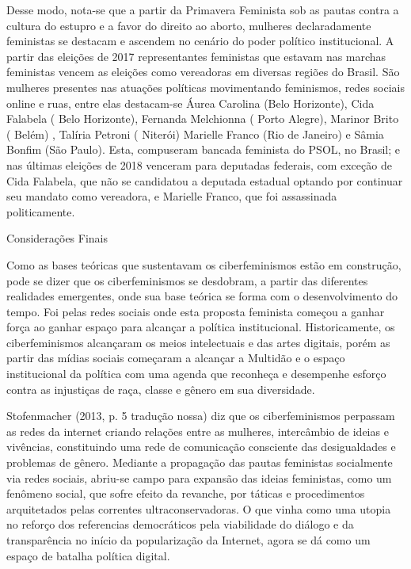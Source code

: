Desse modo, nota-se que a partir da Primavera Feminista sob as pautas
contra a cultura do estupro e a favor do direito ao aborto, mulheres
declaradamente feministas se destacam e ascendem no cenário do poder
político institucional. A partir das eleições de 2017 representantes
feministas que estavam nas marchas feministas vencem as eleições como
vereadoras em diversas regiões do Brasil. São mulheres presentes nas
atuações políticas movimentando feminismos, redes sociais online e ruas,
entre elas destacam-se Áurea Carolina (Belo Horizonte), Cida Falabela (
Belo Horizonte), Fernanda Melchionna ( Porto Alegre), Marinor Brito (
Belém) , Talíria Petroni ( Niterói) Marielle Franco (Rio de Janeiro) e
Sâmia Bonfim (São Paulo). Esta, compuseram bancada feminista do PSOL, no
Brasil; e nas últimas eleições de 2018 venceram para deputadas federais,
com exceção de Cida Falabela, que não se candidatou a deputada estadual
optando por continuar seu mandato como vereadora, e Marielle Franco, que
foi assassinada politicamente.

Considerações Finais

Como as bases teóricas que sustentavam os ciberfeminismos estão em
construção, pode se dizer que os ciberfeminismos se desdobram, a partir
das diferentes realidades emergentes, onde sua base teórica se forma com
o desenvolvimento do tempo. Foi pelas redes sociais onde esta proposta
feminista começou a ganhar força ao ganhar espaço para alcançar a
política institucional. Historicamente, os ciberfeminismos alcançaram os
meios intelectuais e das artes digitais, porém as partir das mídias
sociais começaram a alcançar a Multidão e o espaço institucional da
política com uma agenda que reconheça e desempenhe esforço contra as
injustiças de raça, classe e gênero em sua diversidade.

Stofenmacher (2013, p. 5 tradução nossa) diz que os ciberfeminismos
perpassam as redes da internet criando relações entre as mulheres,
intercâmbio de ideias e vivências, constituindo uma rede de comunicação
consciente das desigualdades e problemas de gênero. Mediante a
propagação das pautas feministas socialmente via redes sociais, abriu-se
campo para expansão das ideias feministas, como um fenômeno social, que
sofre efeito da revanche, por táticas e procedimentos arquitetados pelas
correntes ultraconservadoras. O que vinha como uma utopia no reforço dos
referencias democráticos pela viabilidade do diálogo e da transparência
no início da popularização da Internet, agora se dá como um espaço de
batalha política digital.

